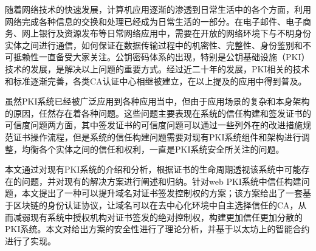 
\begin{cabstract}




随着网络技术的快速发展，计算机应用逐渐的渗透到日常生活中的各个方面，利用网络完成各种信息的交换和处理已经成为日常生活的一部分。在电子邮件、电子商务、网上银行及资源发布等日常网络应用中，需要在开放的网络环境下与不明身份实体之间进行通信，如何保证在数据传输过程中的机密性、完整性、身份鉴别和不可抵赖性一直备受大家关注。公钥密码体系的出现，特别是公钥基础设施（PKI）技术的发展，是解决以上问题的重要方式。经过近二十年的发展，PKI相关的技术和标准逐渐完善，各类CA认证中心相继被建立，在以上提及的应用中得到普及。


虽然PKI系统已经被广泛应用到各种应用当中，但由于应用场景的复杂和本身架构的原因，任然存在着各种问题。这些问题主要表现在系统的信任构建和签发证书的可信度问题两方面，其中签发证书的可信度问题可以通过一些列外在的改进措施规范证书操作流程，但是系统的信任构建问题需要对现有PKI系统组件和架构进行调整，均衡各个实体之间的信任和权利，一直是PKI系统安全所关注的问题。

本文通过对现有PKI系统的介绍和分析，根据证书的生命周期透视该系统中可能存在的问题，并对现有的解决方案进行阐述和归纳。针对web PKI系统中信任构建问题，本文提出了一种可以提升域名对证书签发控制权的方案；该方案给出了一套基于区块链的身份认证协议，让域名可以在去中心化环境中自主选择信任的CA，从而减弱现有系统中授权机构对证书签发的绝对控制权，构建更加信任更加分散的PKI系统。本文对给出方案的安全性进行了理论分析，并基于以太坊上的智能合约进行了实现。






 





\end{cabstract}
